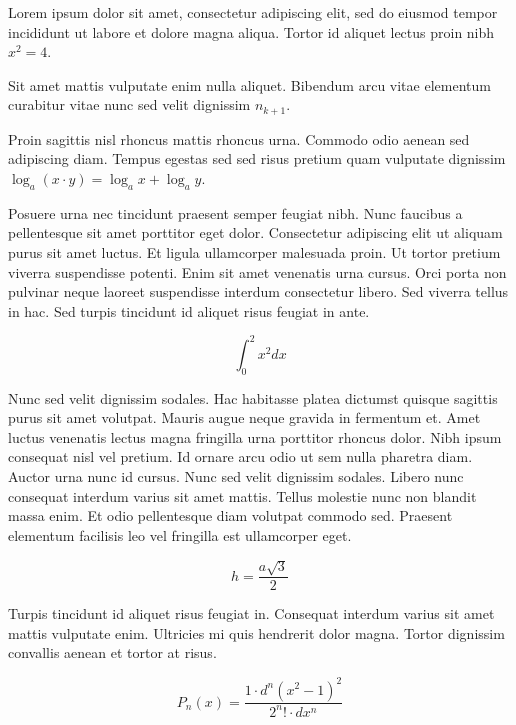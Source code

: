 \documentclass{article}
\begin{document}
	
    Lorem ipsum dolor sit amet, consectetur adipiscing elit, sed do eiusmod tempor incididunt ut labore et dolore magna aliqua. Tortor id aliquet lectus proin nibh 
    \begin{math}
    	x^2=4
    \end{math}.
    \newline
    
    Sit amet mattis vulputate enim nulla aliquet. Bibendum arcu vitae elementum curabitur vitae nunc sed velit dignissim $ n_{k+1}  $.
    \newline
    
   Proin sagittis nisl rhoncus mattis rhoncus urna. Commodo odio aenean sed adipiscing diam. Tempus egestas sed sed risus pretium quam vulputate dignissim \( \log _{a}(x\cdot y)=\log _{a}x+\log _{a}y \).
   \newline
    
    Posuere urna nec tincidunt praesent semper feugiat nibh. Nunc faucibus a pellentesque sit amet porttitor eget dolor. Consectetur adipiscing elit ut aliquam purus sit amet luctus. Et ligula ullamcorper malesuada proin. Ut tortor pretium viverra suspendisse potenti. Enim sit amet venenatis urna cursus. Orci porta non pulvinar neque laoreet suspendisse interdum consectetur libero. Sed viverra tellus in hac. Sed turpis tincidunt id aliquet risus feugiat in ante.
    
    \[ \int_0^2x^2dx  \]
    
    Nunc sed velit dignissim sodales. Hac habitasse platea dictumst quisque sagittis purus sit amet volutpat. Mauris augue neque gravida in fermentum et. Amet luctus venenatis lectus magna fringilla urna porttitor rhoncus dolor. Nibh ipsum consequat nisl vel pretium. Id ornare arcu odio ut sem nulla pharetra diam. Auctor urna nunc id cursus. Nunc sed velit dignissim sodales. Libero nunc consequat interdum varius sit amet mattis. Tellus molestie nunc non blandit massa enim. Et odio pellentesque diam volutpat commodo sed. Praesent elementum facilisis leo vel fringilla est ullamcorper eget.
    
    $$ h=\frac{a\sqrt{3}}{2} $$
    
    Turpis tincidunt id aliquet risus feugiat in. Consequat interdum varius sit amet mattis vulputate enim. Ultricies mi quis hendrerit dolor magna. Tortor dignissim convallis aenean et tortor at risus. 
    
    \begin{displaymath}
    	P_n\left ( x \right ) = \frac{1 \cdot d^n\left ( x^2-1 \right )^2}{2^n ! \cdot dx^n}
    \end{displaymath}
    
\end{document}
